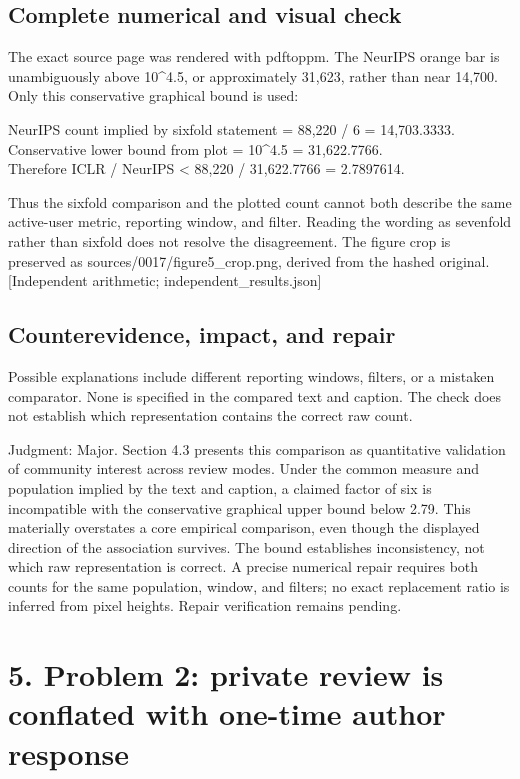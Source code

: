\documentclass[10pt]{article}
\begin{document}
\subsection*{Complete numerical and visual check}
The exact source page was rendered with pdftoppm. The NeurIPS orange bar is unambiguously above 10\textasciicircum{}4.5, or approximately 31,623, rather than near 14,700. Only this conservative graphical bound is used:\par
{\ttfamily\footnotesize NeurIPS count implied by sixfold statement = 88,220 / 6 = 14,703.3333.\\
Conservative lower bound from plot = 10\textasciicircum{}4.5 = 31,622.7766.\\
Therefore ICLR / NeurIPS < 88,220 / 31,622.7766 = 2.7897614.}\par
Thus the sixfold comparison and the plotted count cannot both describe the same active-user metric, reporting window, and filter. Reading the wording as sevenfold rather than sixfold does not resolve the disagreement. The figure crop is preserved as sources/0017/figure5\_crop.png, derived from the hashed original. [Independent arithmetic; independent\_results.json]\par
\subsection*{Counterevidence, impact, and repair}
Possible explanations include different reporting windows, filters, or a mistaken comparator. None is specified in the compared text and caption. The check does not establish which representation contains the correct raw count.\par
Judgment: Major. Section 4.3 presents this comparison as quantitative validation of community interest across review modes. Under the common measure and population implied by the text and caption, a claimed factor of six is incompatible with the conservative graphical upper bound below 2.79. This materially overstates a core empirical comparison, even though the displayed direction of the association survives. The bound establishes inconsistency, not which raw representation is correct. A precise numerical repair requires both counts for the same population, window, and filters; no exact replacement ratio is inferred from pixel heights. Repair verification remains pending.\par
\section*{5. Problem 2: private review is conflated with one-time author response}
\end{document}

